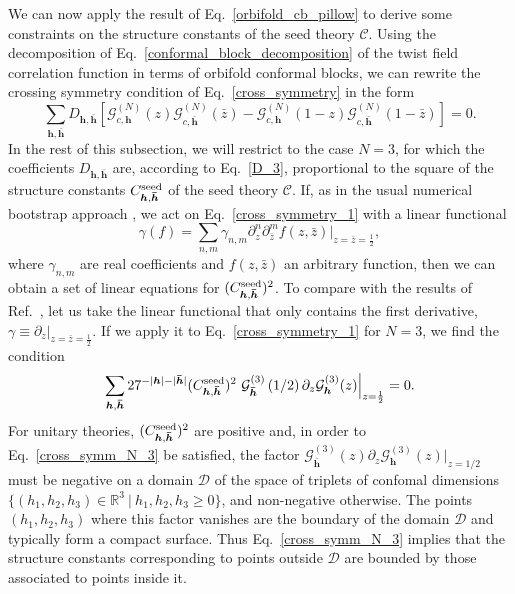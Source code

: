 \documentclass[a4paper,11pt]{article}
\begin{document}
We can now apply the result of Eq.~\eqref{orbifold_cb_pillow} to derive 
some constraints on the structure constants of the seed theory $\mathcal{C}$.
Using the decomposition of Eq.~\eqref{conformal_block_decomposition} of the twist field correlation function 
in terms of orbifold conformal blocks, we can rewrite the crossing symmetry condition 
of Eq.~\eqref{cross_symmetry} in the form
\begin{equation}\label{cross_symmetry_1}
 \sum_{\boldsymbol{h}, \boldsymbol{\bar{h}}} D_{\boldsymbol{h}, \boldsymbol{\bar{h}}}\left[
 \mathcal{G}_{c, \boldsymbol{h}}^{(N)}(z)\mathcal{G}_{c, \boldsymbol{\bar{h}}}^{(N)}(\bar{z})-
 \mathcal{G}_{c, \boldsymbol{h}}^{(N)}(1-z)\mathcal{G}_{c, \boldsymbol{\bar{h}}}^{(N)}(1-\bar{z})\right]=0.
\end{equation}
In the rest of this subsection, we will restrict to the case $N=3$, 
for which the coefficients $D_{\boldsymbol{h}, \boldsymbol{\bar{h}}}$ are, according 
to Eq.~\eqref{D_3}, proportional to the square of the structure constants 
$C_{\boldsymbol{h}, \boldsymbol{\bar{h}}}^{{\rm seed}}$ of the seed 
theory $\mathcal{C}$. If, as in the usual numerical bootstrap approach 
\cite{Rattazzi, Poland}, we act on Eq.~\eqref{cross_symmetry_1} with a linear functional
\begin{equation}
\label{linfunder}
 \gamma(f)=\sum_{n, m} \gamma_{n, m}\partial_{z}^n\partial_{\bar{z}}^m f(z,\bar{z})\Bigr|_{z=\bar{z}=\frac{1}{2}},
\end{equation}
where $\gamma_{n, m}$ are real coefficients and $f(z,\bar{z})$ an arbitrary function, then 
we can obtain a set of linear equations for $(C_{\boldsymbol{h}, \boldsymbol{\bar{h}}}^{{\rm seed}})^2$.
To compare with the results of Ref.~\cite{Collier}, let us take the linear functional that only 
contains the first derivative, $\gamma\equiv\partial_z|_{z=\bar{z}=\frac{1}{2}}$. If we apply it to 
Eq.~\eqref{cross_symmetry_1} for $N=3$, we find the condition
\begin{equation}\label{cross_symm_N_3}
 \sum_{\boldsymbol{h},\boldsymbol{\bar{h}}} 27^{-|\boldsymbol{h}|-|\boldsymbol{\bar{h}}|}
 (C_{\boldsymbol{h}, \boldsymbol{\bar{h}}}^{{\rm seed}})^2~\mathcal{G}_{\boldsymbol{\bar{h}}}^{(3)}\left(1/2\right)
 \partial_z\mathcal{G}_{\boldsymbol{h}}^{(3)}(z)\Bigr|_{z=\frac{1}{2}}=0.
\end{equation}
For unitary theories, $(C_{\boldsymbol{h}, \boldsymbol{\bar{h}}}^{{\rm seed}})^2$ are positive and, 
in order to Eq.~\eqref{cross_symm_N_3} be satisfied, the factor $\mathcal{G}_{\boldsymbol{\bar{h}}}^{(3)}(z)
\partial_z\mathcal{G}_{\boldsymbol{h}}^{(3)}(z)\bigr|_{z=1/2}$ must be negative on a domain $\mathscr{D}$
of the space of triplets of confomal dimensions $\{(h_1, h_2, h_3)\in \mathbb{R}^3~|~h_1, h_2, h_3\geq 0\}$,
and non-negative otherwise. The points $(h_1, h_2, h_3)$ where this factor vanishes are the boundary
of the domain $\mathscr{D}$ and typically form a compact surface. Thus Eq.~\eqref{cross_symm_N_3} implies that the structure constants 
corresponding to points outside $\mathscr{D}$ are bounded by those associated to points inside it. 
\end{document}

